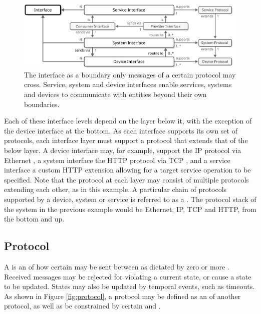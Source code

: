 \vfill

\begin{figure}[ht!]
  \centering
  \includegraphics[scale=0.9]{figures/interface}
  \caption{
    The interface as a boundary only messages of a certain protocol may cross.
    Service, system and device interfaces enable services, systems and devices to communicate with entities beyond their own boundaries.
  }
  \label{fig:interface}
\end{figure}

Each of these interface levels depend on the layer below it, with the exception of the device interface at the bottom.
As each interface supports its own set of protocols, each interface layer must support a protocol that extends that of the below layer.
A device interface may, for example, support the IP \cite{deering2017internet} protocol via Ethernet \cite{iso202188023}, a system interface the HTTP \cite{fielding2014hypertext} protocol via TCP \cite{postel1981transmission}, and a service interface a custom HTTP extension allowing for a target service operation to be specified.
Note that the protocol at each layer may consist of multiple protocols extending each other, as in this example.
A particular chain of protocols supported by a device, system or service is referred to as a .
The protocol stack of the system in the previous example would be Ethernet, IP, TCP and HTTP, from the bottom and up.

\subsection{Protocol}
\label{sec:concepts:protocol}

A  is an   of how certain  may be sent between  as dictated by zero or more .
Received messages may be rejected for violating a current state, or cause a state to be updated.
States may also be updated by temporal events, such as timeouts.
As shown in Figure \ref{fig:protocol}, a protocol may be defined as an  of another protocol, as well as be constrained by certain  and .

